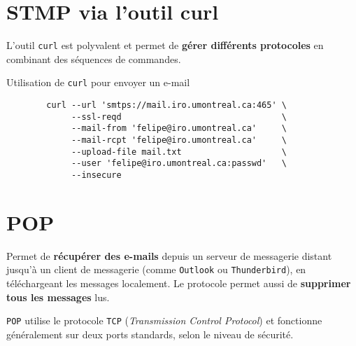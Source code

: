 \documentclass[a4paper]{report}
\begin{document}
    \section{STMP via l'outil curl}
    \begin{Définition}
        L'outil \texttt{curl} est polyvalent et permet de \textbf{gérer différents protocoles}  
        en combinant des séquences de commandes.
    \end{Définition}

    \begin{EExample}{Utilisation de \texttt{curl} pour envoyer un e-mail}{}
        \begin{center}
            \begin{lstlisting}
        curl --url 'smtps://mail.iro.umontreal.ca:465' \
             --ssl-reqd                                \
             --mail-from 'felipe@iro.umontreal.ca'     \
             --mail-rcpt 'felipe@iro.umontreal.ca'     \
             --upload-file mail.txt                    \
             --user 'felipe@iro.umontreal.ca:passwd'   \
             --insecure               
            \end{lstlisting}
            \hyperlink{Utilisation de curl pour envoyer un e-mail}{
                \xtargetbox[myb]{
                    \fontfamily{lmss}
                    \selectfont Détails des options \;}
                }
        \end{center}
    \end{EExample}              
    


    \section{POP}
    \begin{Protocole}[POP]
        Permet de \textbf{récupérer des e-mails} depuis un serveur de messagerie 
        distant jusqu'à un client de messagerie (comme \texttt{Outlook} ou 
        \texttt{Thunderbird}), en téléchargeant les messages localement. Le protocole 
        permet aussi de \textbf{supprimer tous les messages} lus.  
    \end{Protocole}

    \texttt{POP} utilise le protocole \texttt{TCP} (\textit{Transmission Control 
    Protocol}) et fonctionne généralement sur deux ports standards, selon le 
    niveau de sécurité.

    \begin{center}
    \end{center}
\end{document}
